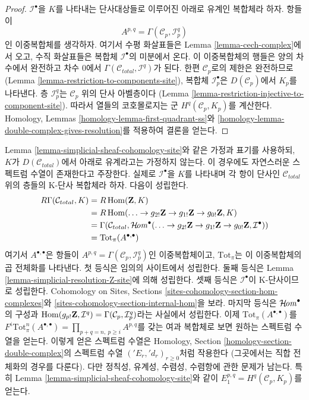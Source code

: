\begin{proof}
$\mathcal{I}^\bullet$을 $K$를 나타내는 단사대상들로 이루어진
아래로 유계인 복합체라 하자. 항들이
$$
A^{p, q} = \Gamma(\mathcal{C}_p, \mathcal{I}^q_p)
$$
인 이중복합체를 생각하자. 여기서 수평 화살표들은
Lemma \ref{lemma-cech-complex}에서 오고, 수직 화살표들은 복합체
$\mathcal{I}^\bullet$의 미분에서 온다. 이 이중복합체의 행들은
양의 차수에서 완전하고 차수 $0$에서
$\Gamma(\mathcal{C}_{total}, \mathcal{I}^q)$가 된다.
한편 $\mathcal{C}_p$로의 제한은 완전하므로
(Lemma \ref{lemma-restriction-to-components-site}),
복합체 $\mathcal{I}_p^\bullet$은 $D(\mathcal{C}_p)$에서 $K_p$를 나타낸다.
층 $\mathcal{I}_p^q$는 $\mathcal{C}_p$ 위의 단사 아벨층이다
(Lemma \ref{lemma-restriction-injective-to-component-site}).
따라서 열들의 코호몰로지는 군 $H^q(\mathcal{C}_p, K_p)$를 계산한다.
Homology, Lemmas \ref{homology-lemma-first-quadrant-ss}와
\ref{homology-lemma-double-complex-gives-resolution}를 적용하여 결론을 얻는다.
\end{proof}


\begin{remark}
\label{remark-simplicial-cohomology-site}
Lemma \ref{lemma-simplicial-sheaf-cohomology-site}와 같은 가정과 표기를
사용하되, $K$가 $D(\mathcal{C}_{total})$에서 아래로 유계라고는
가정하지 않는다. 이 경우에도 자연스러운 스펙트럼 수열이 존재한다고 주장한다.
실제로 $\mathcal{I}^\bullet$을 $K$를 나타내며 각 항이 단사인
$\mathcal{C}_{total}$ 위의 층들의 K-단사 복합체라 하자. 다음이 성립한다.
\begin{align*}
R\Gamma(\mathcal{C}_{total}, K)
& =
R\mathop{\mathrm{Hom}}\nolimits(\mathbf{Z}, K) \\
& =
R\mathop{\mathrm{Hom}}\nolimits(
\ldots \to g_{2!}\mathbf{Z} \to g_{1!}\mathbf{Z} \to g_{0!}\mathbf{Z}, K) \\
& =
\Gamma(\mathcal{C}_{total},
\mathop{\mathcal{H}\!\mathit{om}}\nolimits^\bullet(
\ldots \to g_{2!}\mathbf{Z} \to g_{1!}\mathbf{Z} \to g_{0!}\mathbf{Z},
\mathcal{I}^\bullet)) \\
& =
\text{Tot}_\pi(A^{\bullet, \bullet})
\end{align*}
여기서 $A^{\bullet, \bullet}$은 항들이
$A^{p, q} = \Gamma(\mathcal{C}_p, \mathcal{I}^q_p)$인 이중복합체이고,
$\text{Tot}_\pi$는 이 이중복합체의 곱 전체화를 나타낸다.
첫 등식은 임의의 사이트에서 성립한다. 둘째 등식은
Lemma \ref{lemma-simplicial-resolution-Z-site}에 의해 성립한다.
셋째 등식은 $\mathcal{I}^\bullet$이 K-단사이므로 성립한다.
Cohomology on Sites, Sections
\ref{sites-cohomology-section-hom-complexes}와
\ref{sites-cohomology-section-internal-hom}을 보라.
마지막 등식은 $\mathop{\mathcal{H}\!\mathit{om}}\nolimits^\bullet$의 구성과
$\mathop{\mathrm{Hom}}\nolimits(g_{p!}\mathbf{Z}, \mathcal{I}^q) =
\Gamma(\mathcal{C}_p, \mathcal{I}^q_p)$라는 사실에서 성립한다.
이제 $\text{Tot}_\pi(A^{\bullet, \bullet})$를
$F^i\text{Tot}^n_\pi(A^{\bullet, \bullet}) =
\prod_{p + q = n,\ p \geq i} A^{p, q}$를 갖는 여과 복합체로 보면
원하는 스펙트럼 수열을 얻는다. 이렇게 얻은 스펙트럼 수열은
Homology, Section \ref{homology-section-double-complex}의 스펙트럼 수열
$({}'E_r, {}'d_r)_{r \geq 0}$처럼 작용한다
(그곳에서는 직합 전체화의 경우를 다룬다). 다만 정칙성, 유계성, 수렴성,
수렴항에 관한 문제가 남는다. 특히 Lemma
\ref{lemma-simplicial-sheaf-cohomology-site}와 같이
$E_1^{p, q} = H^q(\mathcal{C}_p, K_p)$를 얻는다.
\end{remark}

